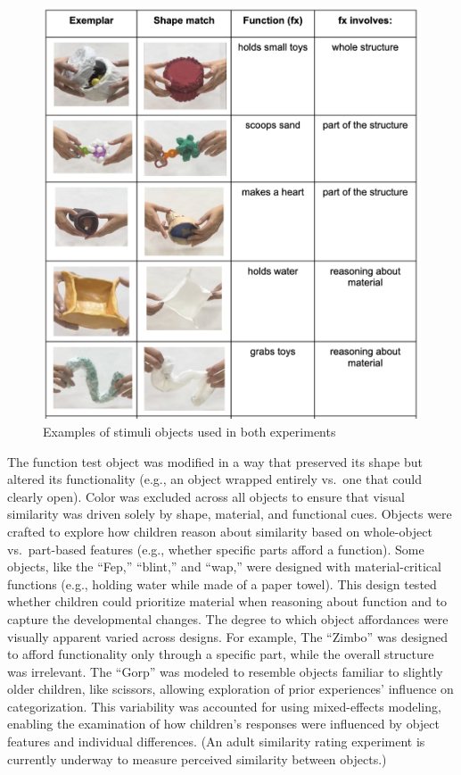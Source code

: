 \documentclass[10pt, letterpaper]{article}
\newenvironment{CodeChunk}{}{}
\begin{document}
\begin{CodeChunk}
\begin{figure}[tb]
\includegraphics[width=1\linewidth]{stimuli} \caption[Examples of stimuli objects used in both experiments]{Examples of stimuli objects used in both experiments}\label{fig:stimulipics }
\end{figure}
\end{CodeChunk}

The function test object was modified in a way that preserved its shape
but altered its functionality (e.g., an object wrapped entirely vs.~one
that could clearly open). Color was excluded across all objects to
ensure that visual similarity was driven solely by shape, material, and
functional cues. Objects were crafted to explore how children reason
about similarity based on whole-object vs.~part-based features (e.g.,
whether specific parts afford a function). Some objects, like the
``Fep,'' ``blint,'' and ``wap,'' were designed with material-critical
functions (e.g., holding water while made of a paper towel). This design
tested whether children could prioritize material when reasoning about
function and to capture the developmental changes. The degree to which
object affordances were visually apparent varied across designs. For
example, The ``Zimbo'' was designed to afford functionality only through
a specific part, while the overall structure was irrelevant. The
``Gorp'' was modeled to resemble objects familiar to slightly older
children, like scissors, allowing exploration of prior experiences'
influence on categorization. This variability was accounted for using
mixed-effects modeling, enabling the examination of how children's
responses were influenced by object features and individual differences.
(An adult similarity rating experiment is currently underway to measure
perceived similarity between objects.)
\end{document}

